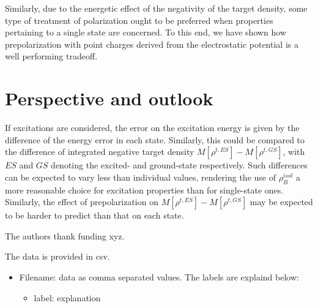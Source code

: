 \documentclass[journal=jctcce,manuscript=article, layout=twocolumn]{achemso}
\begin{document}
Similarly, due to the energetic effect of the negativity of the target density, some type of treatment of polarization ought to be preferred when properties pertaining to a single state are concerned.
To this end, we have shown how prepolarization with point charges derived from the electrostatic potential is a well performing tradeoff.

\section{Perspective and outlook}
If excitations are considered, the error on the excitation energy is given by the difference of the energy error in each state. 
Similarly, this could be compared to the difference of integrated negative target density $M[\rho^{t, ES}] - M[\rho^{t, GS}]$, with $ES$ and $GS$ denoting the excited- and ground-state respectively.
Such differences can be expected to vary less than individual values, rendering the use of $\rho_B^{isol}$ a more reasonable choice for excitation properties than for single-state ones.
Similarly, the effect of prepolarization on $M[\rho^{t, ES}] - M[\rho^{t, GS}]$ may be expected to be harder to predict than that on each state. 

\begin{acknowledgement}
The authors thank funding xyz.
\end{acknowledgement}

\begin{suppinfo}
The data is provided in csv.
\begin{itemize}
  \item Filename: data as comma separated values. The labels are explaind below:
  \begin{itemize}
   \item label: explanation
  \end{itemize}
\end{itemize}
\end{suppinfo}
\end{document}
